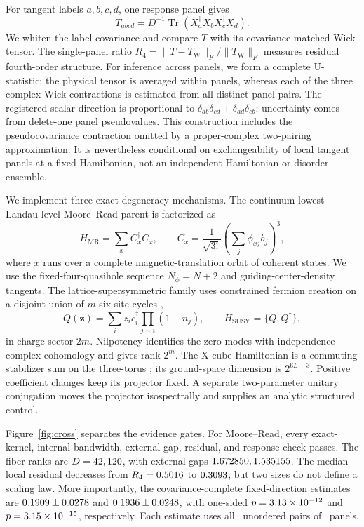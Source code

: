 \documentclass[aps,prb,reprint,superscriptaddress,longbibliography,floatfix]{revtex4-2}
\newcommand{\Tr}{\operatorname{Tr}}
\begin{document}
For tangent labels \(a,b,c,d\), one response panel gives
\begin{equation}
T_{abcd}=D^{-1}\Tr(X_a^\dagger X_bX_c^\dagger X_d).
\label{eq:fourpoint}
\end{equation}
We whiten the label covariance and compare \(T\) with its covariance-matched Wick tensor. The single-panel ratio \(R_4=\lVert T-T_{\mathrm W}\rVert_F/\lVert T_{\mathrm W}\rVert_F\) measures residual fourth-order structure. For inference across panels, we form a complete U-statistic: the physical tensor is averaged within panels, whereas each of the three complex Wick contractions is estimated from all distinct panel pairs. The registered scalar direction is proportional to \(\delta_{ab}\delta_{cd}+\delta_{ad}\delta_{cb}\); uncertainty comes from delete-one panel pseudovalues. This construction includes the pseudocovariance contraction omitted by a proper-complex two-pairing approximation. It is nevertheless conditional on exchangeability of local tangent panels at a fixed Hamiltonian, not an independent Hamiltonian or disorder ensemble.

We implement three exact-degeneracy mechanisms. The continuum lowest-Landau-level Moore--Read parent \cite{mooreread1991,zhang2023parent} is factorized as
\begin{equation}
H_{\mathrm{MR}}=\sum_x C_x^\dagger C_x,\qquad C_x=\frac{1}{\sqrt{3!}}\left(\sum_j\phi_{xj}b_j\right)^3,
\label{eq:mrparent}
\end{equation}
where \(x\) runs over a complete magnetic-translation orbit of coherent states. We use the fixed-four-quasihole sequence \(N_\phi=N+2\) and guiding-center-density tangents. The lattice-supersymmetric family uses constrained fermion creation on a disjoint union of \(m\) six-site cycles \cite{fendley2003lattice,huijse2010cohomology},
\begin{equation}
Q(\bm z)=\sum_i z_i c_i^\dagger\prod_{j\sim i}(1-n_j),\qquad H_{\mathrm{SUSY}}=\{Q,Q^\dagger\},
\label{eq:susyparent}
\end{equation}
in charge sector \(2m\). Nilpotency identifies the zero modes with independence-complex cohomology and gives rank \(2^m\). The X-cube Hamiltonian is a commuting stabilizer sum on the three-torus \cite{vijay2016xcube}; its ground-space dimension is \(2^{6L-3}\). Positive coefficient changes keep its projector fixed. A separate two-parameter unitary conjugation moves the projector isospectrally and supplies an analytic structured control.

Figure~\ref{fig:cross} separates the evidence gates. For Moore--Read, every exact-kernel, internal-bandwidth, external-gap, residual, and response check passes. The fiber ranks are \(D=42,120\), with external gaps \(1.672850,1.535155\). The median local residual decreases from \(R_4=0.5016\) to \(0.3093\), but two sizes do not define a scaling law. More importantly, the covariance-complete fixed-direction estimates are \(0.1909\pm0.0278\) and \(0.1936\pm0.0248\), with one-sided \(p=3.13\times 10^{-12}\) and \(p=3.15\times 10^{-15}\), respectively. Each estimate uses all \PanelPairCount\ unordered pairs of \PanelCount\ panels.
\end{document}
